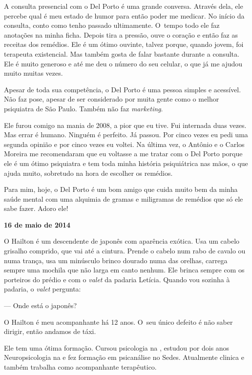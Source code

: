 A consulta presencial com o Del Porto é uma grande conversa. Através
dela, ele percebe qual é meu estado de humor para então poder me
medicar. No início da consulta, conto como tenho passado ultimamente. O~tempo todo ele faz anotações na minha ficha. Depois tira a pressão, ouve
o coração e então faz as receitas dos remédios. Ele é um ótimo ouvinte,
talvez porque, quando jovem, foi terapeuta existencial. Mas também gosta
de falar bastante durante a consulta. Ele é muito generoso e até me deu
o número do seu celular, o que já me ajudou muito muitas vezes.

Apesar de toda sua competência, o Del Porto é uma pessoa simples e
acessível. Não faz pose, apesar de ser considerado por muita gente como
o melhor psiquiatra de São Paulo. Também não faz \emph{marketing}.

Ele furou comigo na mania de 2008, a pior que eu tive. Fui internada
duas vezes. Mas errar é humano. Ninguém é perfeito. Já passou. Por cinco
vezes eu pedi uma segunda opinião e por cinco vezes eu voltei. Na última
vez, o Antônio e o Carlos Moreira me recomendaram que eu voltasse a me
tratar com o Del Porto porque ele é um ótimo psiquiatra e tem toda minha
história psiquiátrica nas mãos, o que ajuda muito, sobretudo na hora de
escolher os remédios.

Para mim, hoje, o Del Porto é um bom amigo que cuida muito bem da minha
saúde mental com uma alquimia de gramas e miligramas de remédios que só
ele sabe fazer. Adoro ele!

\begin{center}\asterisc{}\textbf{}\end{center}

\begin{flushright}\textbf{16 de maio de 2014}\end{flushright}


O Hailton é um descendente de japonês com aparência exótica. Usa um
cabelo grisalho comprido, que vai até a cintura. Prende o cabelo num
rabo de cavalo ou numa trança, usa um minúsculo brinco dourado numa das
orelhas, carrega sempre uma mochila que não larga em canto nenhum. Ele
brinca sempre com os porteiros do prédio e com o \emph{valet} da padaria
Letícia. Quando vou sozinha à padaria, o \emph{valet} pergunta:

--- Onde está o japonês?

O Hailton é meu acompanhante há 12 anos. O~seu único defeito é não saber
dirigir, então andamos de táxi.

Ele tem uma ótima formação. Cursou psicologia na , estudou por dois
anos Neuropsicologia na  e fez formação em psicanálise no Sedes.
Atualmente clinica e também trabalha como acompanhante terapêutico.


